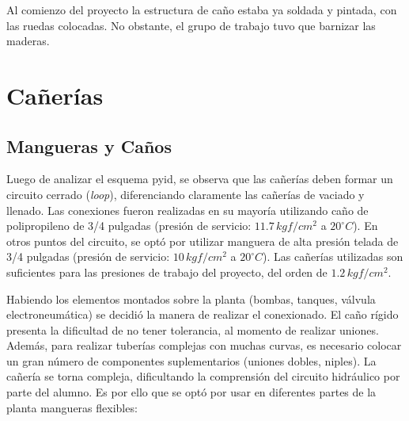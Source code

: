Al comienzo del proyecto la estructura de caño estaba ya soldada y pintada, con
las ruedas colocadas.
No obstante, el grupo de trabajo tuvo que barnizar las maderas.

\section{Cañerías}
\label{sec:Canerias}

\subsection{Mangueras y Caños}
Luego de analizar el esquema \gls{pyid}, se observa que las cañerías deben
formar un circuito cerrado (\emph{loop}), diferenciando
claramente las cañerías de vaciado y llenado.
Las conexiones fueron realizadas en su mayoría utilizando caño de polipropileno
de 3/4
pulgadas (presión de servicio: $11.7\,kgf/cm^2$ a $20^\circ C$).
En otros puntos del circuito, se optó por utilizar manguera de alta presión
telada de 3/4 pulgadas (presión de servicio: $10\,kgf/cm^2$ a $20^\circ C$).
Las cañerías utilizadas son suficientes para las presiones de trabajo del
proyecto, del orden de $1.2\,kgf/cm^2$.

Habiendo los elementos montados sobre la planta (bombas, tanques, válvula
electroneumática) se decidió la manera de realizar el conexionado.
El caño rígido presenta la dificultad de no tener tolerancia, al momento de
realizar uniones.
Además, para realizar tuberías complejas con muchas curvas, es necesario
colocar un gran número de componentes suplementarios (uniones dobles,
niples).
La cañería se torna compleja, dificultando la comprensión del circuito
hidráulico por parte del alumno.
Es por ello que se optó por usar en diferentes partes de la planta mangueras
flexibles:

